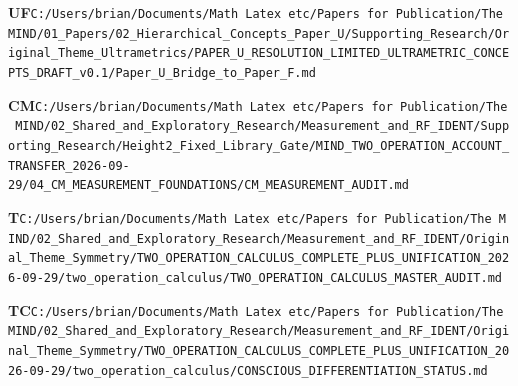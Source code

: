 \documentclass[10pt,letterpaper]{article}
\begin{document}
\noindent\textbf{UF}\quad \texttt{C:/\allowbreak{}Users/\allowbreak{}brian/\allowbreak{}Documents/\allowbreak{}Math\ Latex\ etc/\allowbreak{}Papers\ for\ Publication/\allowbreak{}The\ MIND/\allowbreak{}01\_\allowbreak{}Papers/\allowbreak{}02\_\allowbreak{}Hierarchical\_\allowbreak{}Concepts\_\allowbreak{}Paper\_\allowbreak{}U/\allowbreak{}Supporting\_\allowbreak{}Research/\allowbreak{}Original\_\allowbreak{}Theme\_\allowbreak{}Ultrametrics/\allowbreak{}PAPER\_\allowbreak{}U\_\allowbreak{}RESOLUTION\_\allowbreak{}LIMITED\_\allowbreak{}ULTRAMETRIC\_\allowbreak{}CONCEPTS\_\allowbreak{}DRAFT\_\allowbreak{}v0.1/\allowbreak{}Paper\_\allowbreak{}U\_\allowbreak{}Bridge\_\allowbreak{}to\_\allowbreak{}Paper\_\allowbreak{}F.md}\par
\noindent\textbf{CM}\quad \texttt{C:/\allowbreak{}Users/\allowbreak{}brian/\allowbreak{}Documents/\allowbreak{}Math\ Latex\ etc/\allowbreak{}Papers\ for\ Publication/\allowbreak{}The\ MIND/\allowbreak{}02\_\allowbreak{}Shared\_\allowbreak{}and\_\allowbreak{}Exploratory\_\allowbreak{}Research/\allowbreak{}Measurement\_\allowbreak{}and\_\allowbreak{}RF\_\allowbreak{}IDENT/\allowbreak{}Supporting\_\allowbreak{}Research/\allowbreak{}Height2\_\allowbreak{}Fixed\_\allowbreak{}Library\_\allowbreak{}Gate/\allowbreak{}MIND\_\allowbreak{}TWO\_\allowbreak{}OPERATION\_\allowbreak{}ACCOUNT\_\allowbreak{}TRANSFER\_\allowbreak{}2026-\allowbreak{}09-\allowbreak{}29/\allowbreak{}04\_\allowbreak{}CM\_\allowbreak{}MEASUREMENT\_\allowbreak{}FOUNDATIONS/\allowbreak{}CM\_\allowbreak{}MEASUREMENT\_\allowbreak{}AUDIT.md}\par
\noindent\textbf{T}\quad \texttt{C:/\allowbreak{}Users/\allowbreak{}brian/\allowbreak{}Documents/\allowbreak{}Math\ Latex\ etc/\allowbreak{}Papers\ for\ Publication/\allowbreak{}The\ MIND/\allowbreak{}02\_\allowbreak{}Shared\_\allowbreak{}and\_\allowbreak{}Exploratory\_\allowbreak{}Research/\allowbreak{}Measurement\_\allowbreak{}and\_\allowbreak{}RF\_\allowbreak{}IDENT/\allowbreak{}Original\_\allowbreak{}Theme\_\allowbreak{}Symmetry/\allowbreak{}TWO\_\allowbreak{}OPERATION\_\allowbreak{}CALCULUS\_\allowbreak{}COMPLETE\_\allowbreak{}PLUS\_\allowbreak{}UNIFICATION\_\allowbreak{}2026-\allowbreak{}09-\allowbreak{}29/\allowbreak{}two\_\allowbreak{}operation\_\allowbreak{}calculus/\allowbreak{}TWO\_\allowbreak{}OPERATION\_\allowbreak{}CALCULUS\_\allowbreak{}MASTER\_\allowbreak{}AUDIT.md}\par
\noindent\textbf{TC}\quad \texttt{C:/\allowbreak{}Users/\allowbreak{}brian/\allowbreak{}Documents/\allowbreak{}Math\ Latex\ etc/\allowbreak{}Papers\ for\ Publication/\allowbreak{}The\ MIND/\allowbreak{}02\_\allowbreak{}Shared\_\allowbreak{}and\_\allowbreak{}Exploratory\_\allowbreak{}Research/\allowbreak{}Measurement\_\allowbreak{}and\_\allowbreak{}RF\_\allowbreak{}IDENT/\allowbreak{}Original\_\allowbreak{}Theme\_\allowbreak{}Symmetry/\allowbreak{}TWO\_\allowbreak{}OPERATION\_\allowbreak{}CALCULUS\_\allowbreak{}COMPLETE\_\allowbreak{}PLUS\_\allowbreak{}UNIFICATION\_\allowbreak{}2026-\allowbreak{}09-\allowbreak{}29/\allowbreak{}two\_\allowbreak{}operation\_\allowbreak{}calculus/\allowbreak{}CONSCIOUS\_\allowbreak{}DIFFERENTIATION\_\allowbreak{}STATUS.md}\par
\end{document}
